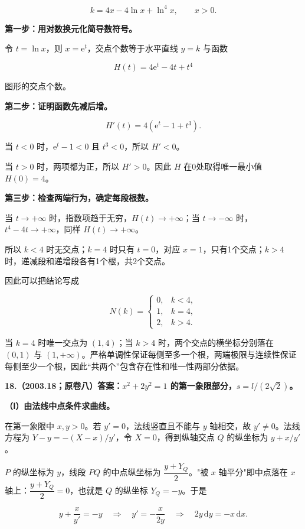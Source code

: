 \documentclass[UTF8,11pt,fontset=windows]{ctexart}
\begin{document}
$$
k=4x-4\ln x+\ln^4x,\qquad x>0.
$$

\textbf{第一步：用对数换元化简导数符号。}

令 $t=\ln x$，则 $x=\mathrm e^t$，交点个数等于水平直线 $y=k$ 与函数

$$
H(t)=4\mathrm e^t-4t+t^4
$$

图形的交点个数。

\textbf{第二步：证明函数先减后增。}

$$
H'(t)=4(\mathrm e^t-1+t^3).
$$

当 $t<0$ 时，$\mathrm e^t-1<0$ 且 $t^3<0$，所以 $H'<0$。

当 $t>0$ 时，两项都为正，所以 $H'>0$。因此 $H$ 在0处取得唯一最小值 $H(0)=4$。

\textbf{第三步：检查两端行为，确定每段根数。}

当 $t\to+\infty$ 时，指数项趋于无穷，$H(t)\to+\infty$；当 $t\to-\infty$ 时，$t^4-4t\to+\infty$，同样 $H(t)\to+\infty$。

所以 $k<4$ 时无交点；$k=4$ 时只有 $t=0$，对应 $x=1$，只有1个交点；$k>4$ 时，递减段和递增段各有1个根，共2个交点。

因此可以把结论写成

$$
N(k)=\begin{cases}0,&k<4,\\1,&k=4,\\2,&k>4.\end{cases}
$$

当 $k=4$ 时唯一交点为 $(1,4)$；当 $k>4$ 时，两个交点的横坐标分别落在 $(0,1)$ 与 $(1,+\infty)$。严格单调性保证每侧至多一个根，两端极限与连续性保证每侧至少一个根，因此“共两个”包含存在性和唯一性两部分依据。

\clearpage

\textbf{18.（2003.18；原卷八）答案：$x^2+2y^2=1$ 的第一象限部分，$s=l/(2\sqrt2)$。}

\textbf{（Ⅰ）由法线中点条件求曲线。}

在第一象限中 $x,y>0$。若 $y'=0$，法线竖直且不能与 $y$ 轴相交，故 $y'\ne0$。法线方程为 $Y-y=-(X-x)/y'$，令 $X=0$，得到纵轴交点 $Q$ 的纵坐标为 $y+x/y'$。

$P$ 的纵坐标为 $y$，线段 $PQ$ 的中点纵坐标为 $\dfrac{y+Y_Q}{2}$。"被 $x$ 轴平分"即中点落在 $x$ 轴上：$\dfrac{y+Y_Q}{2}=0$，也就是 $Q$ 的纵坐标 $Y_Q=-y$。于是

$$
y+\frac{x}{y'}=-y
\quad\Longrightarrow\quad
y'=-\frac{x}{2y}
\quad\Longrightarrow\quad
2y\,\mathrm dy=-x\,\mathrm dx.
$$
\end{document}
